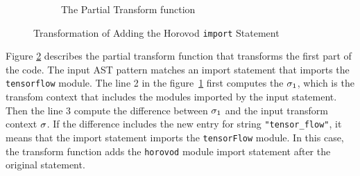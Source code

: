 \begin{figure}[ht!]
\begin{subfigure}[t]{\textwidth}
        \caption{The Partial Transform function}
        \label{fig:trans:ex01:fn}
    \end{subfigure}

    \caption{Transformation of Adding the Horovod {\tt import} Statement}
    \label{fig:trans:ex01}
\end{figure}


Figure \ref{fig:trans:ex01} describes the partial transform function that
transforms the first part of the code.
The input AST pattern matches an import statement that imports the
{\tt tensorflow} module.
The line 2 in the figure~\ref{fig:trans:ex01:fn} first computes the
$\sigma_{1}$, which is the transfom context that includes the modules 
imported by the input statement.
Then the line 3 compute the difference between $\sigma_{1}$ 
and the input transform context $\sigma$.
If the difference includes the new entry for string {\tt "tensor\_flow"},
it means that the import statement imports the {\tt tensorFlow} module.
In this case, the transform function adds the {\tt horovod} module import 
statement after the original statement.

